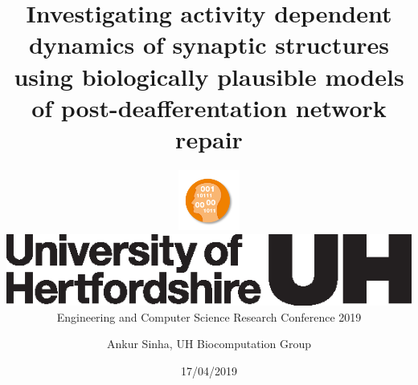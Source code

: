 
\usepackage{color}
\usepackage{tipa}
\usepackage[scale=2]{ccicons}
\usepackage{amssymb}
\usepackage{tikz}
\usetikzlibrary{arrows.meta, arrows}
\usepackage{pgfplots}
\usepackage{jneurosci}
\usepackage{subfig}
\usepackage[T1]{fontenc}
\usepackage[utf8]{inputenc}
\usepackage[style=nature,backend=biber,autocite=footnote]{biblatex}

\usepackage[default,osfigures,scale=0.95]{opensans}
\usepackage[normalem]{ulem}
\usepackage{hyperref}
\hypersetup{colorlinks,linkcolor=Green,urlcolor=links}
\usepackage{graphicx}
\usepackage{algorithmic}
\usepackage{textcomp}
\usepackage{wrapfig}
\usepackage{textgreek}
\usepackage{euler}



\title{\centering \vspace{1cm}Investigating activity dependent dynamics of synaptic structures using biologically plausible models of post-deafferentation network repair\\}
\subtitle{\normalsize\centering\includegraphics[width=0.15\textwidth]{99_images/UH-IT-theme.png}\\\includegraphics[scale=0.5]{99_images/UH-Logo-Black.eps}\\\vspace{0.1cm}Engineering and Computer Science Research Conference 2019\\}
\author[Ankur Sinha]{Ankur Sinha, UH Biocomputation Group}
\date{17/04/2019}

